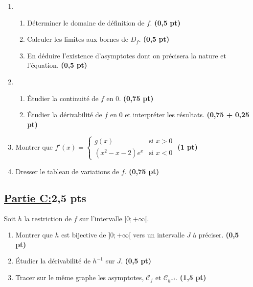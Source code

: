 \documentclass[12pt,a4paper]{article}
\begin{document}
\begin{enumerate}
    \item 
    \begin{enumerate}
        \item Déterminer le domaine de définition de \( f \). \hfill \textbf{(0,5 pt)}
        \item Calculer les limites aux bornes de \( D_f \). \hfill \textbf{(0,5 pt)}
        \item En déduire l’existence d’asymptotes dont on précisera la nature et l’équation. \hfill \textbf{(0,5 pt)}
    \end{enumerate}

    \item 
    \begin{enumerate}
        \item Étudier la continuité de \( f \) en 0. \hfill \textbf{(0,75 pt)}
        \item Étudier la dérivabilité de \( f \) en 0 et interpréter les résultats. \hfill \textbf{(0,75 + 0,25 pt)}
    \end{enumerate}

    \item Montrer que 
    \(
    f'(x) = 
    \begin{cases}
    g(x) & \text{si } x > 0 \\
    (x^2 - x - 2)e^x & \text{si } x < 0
    \end{cases}
    \) \hfill \textbf{(1 pt)}

    \item Dresser le tableau de variations de \( f \). \hfill \textbf{(0,75 pt)}
\end{enumerate}

\vspace{0.4em}
\subsection*{\underline{Partie C:}\quad\textbf{2,5 pts}}
Soit \( h \) la restriction de \( f \) sur l’intervalle \( ]0 ; +\infty[ \).
\begin{enumerate}
    \item Montrer que \( h \) est bijective de \( ]0 ; +\infty[ \) vers un intervalle \( J \) à préciser. \hfill \textbf{(0,5 pt)}
    \item Étudier la dérivabilité de \( h^{-1} \) sur \( J \). \hfill \textbf{(0,5 pt)}
    \item Tracer sur le même graphe les asymptotes, \( \mathcal{C}_f \) et \( \mathcal{C}_{h^{-1}} \). \hfill \textbf{(1,5 pt)}
\end{enumerate}
\end{document}
